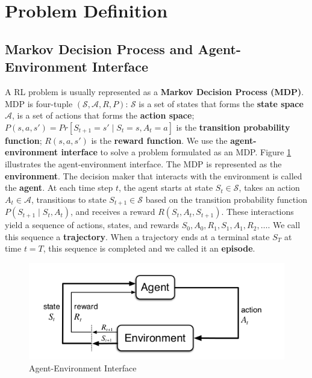 \section{Problem Definition}

\subsection{Markov Decision Process and Agent-Environment Interface}
A RL problem is usually represented as a \textbf{Markov Decision Process (MDP)}.
MDP is four-tuple $(\mathcal{S}, \mathcal{A}, R, P)$:
$\mathcal{S}$ is a set of states that forms the \textbf{state space}
$\mathcal{A}$, is a set of actions that forms the \textbf{action space};
$P(s, a, s') = Pr[ S_{t+1} = s' \mid  S_t = s, A_t = a]$ is the \textbf{transition probability function};
$R(s, a, s')$ is the \textbf{reward function}.
We use the \textbf{agent-environment interface} to solve a problem formulated as an MDP.
Figure \ref{fig:agent_environment_interface} illustrates the agent-environment interface.
The MDP is represented as the \textbf{environment}.
The decision maker that interacts with the environment is called the \textbf{agent}.
At each time step $t$, the agent starts at state $S_t \in \mathcal{S}$, takes an action $A_t \in \mathcal{A}$,
transitions to state $S_{t+1} \in \mathcal{S}$ based on the transition probability function $P(S_{t+1} \mid S_t, A_t)$,
and receives a reward $R(S_t, A_t, S_{t+1})$.
These interactions yield a sequence of actions, states, and rewards $S_{0}, A_{0}, R_{1}, S_{1}, A_{1}, R_{2}, \dots$.
We call this sequence a \textbf{trajectory}.
When a trajectory ends at a terminal state $S_T$ at time $t = T$, this sequence is completed and we called it an \textbf{episode}.

\begin{figure}[ht]
    \centering
    \includegraphics[scale=0.5]{assets/agent_environment_interface.png}
    \caption[]{Agent-Environment Interface}
    \label{fig:agent_environment_interface}
\end{figure}

